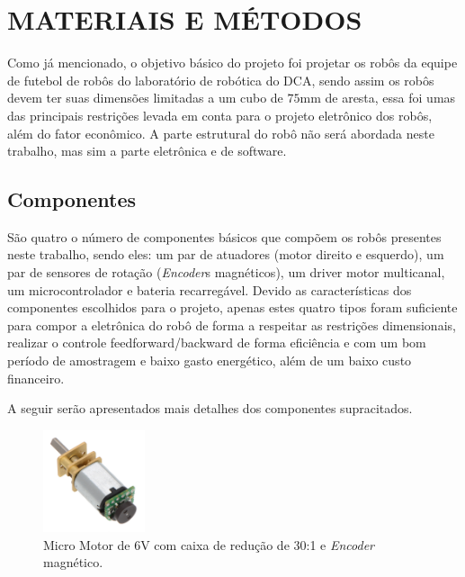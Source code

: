 \section{MATERIAIS E MÉTODOS}
Como já mencionado, o objetivo básico do projeto foi projetar os robôs da equipe de futebol de robôs do laboratório de robótica do DCA, sendo assim os robôs devem ter suas dimensões limitadas a um cubo de $75$mm de aresta, essa foi umas das principais restrições levada em conta para o projeto eletrônico dos robôs, além do fator econômico.  A parte estrutural do robô não será abordada neste trabalho, mas sim a parte eletrônica e de software.

\subsection{Componentes}
São quatro o número de componentes básicos que compõem os robôs presentes neste trabalho, sendo eles: um par de atuadores (motor direito e esquerdo), um par de sensores de rotação (\textit{Encoder}s magnéticos), um driver motor multicanal, um microcontrolador e bateria recarregável. Devido as características dos componentes escolhidos para o projeto, apenas estes quatro tipos foram suficiente para compor a eletrônica do robô de forma a respeitar as restrições dimensionais, realizar o controle feedforward/backward de forma eficiência e com um bom período de amostragem e baixo gasto energético, além de um baixo custo financeiro.

A seguir serão apresentados mais detalhes dos componentes supracitados.

\begin{figure}[H]
    \centering
    \includegraphics[width=3cm]{imagens/eletronica/motor_com_encoder.jpg}
    \caption{Micro Motor de 6V com caixa de redução de 30:1 e \textit{Encoder} magnético.}
    \label{fig:motor_com_encoder}
\end{figure}

